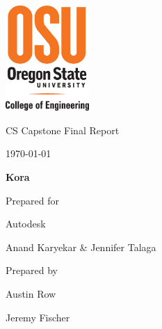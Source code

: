 \documentclass[onecolumn, draftclsnofoot,10pt, compsoc]{IEEEtran}
\def \CapstoneTeamName{\textbf{Insert Team Name Here} }
\def \botname{Kora\xspace}
\def \GroupMemberOne{Austin Row}
\def \GroupMemberTwo{Jeremy Fischer}
\def \CapstoneProjectName{\botname}
\def \CapstoneSponsorCompany{Autodesk}
\def \CapstoneSponsorPerson{Anand Karyekar \& Jennifer Talaga}
\def \DocType{ Final Report}
\newcommand{\NameSigPair}[1]{\par
\makebox[2.75in][r]{#1} \hfil 	\makebox[3.25in]{\makebox[2.25in]{\hrulefill} \hfill		\makebox[.75in]{\hrulefill}}
\par\vspace{-12pt} \textit{\tiny\noindent
\makebox[2.75in]{} \hfil		\makebox[3.25in]{\makebox[2.25in][r]{Signature} \hfill	\makebox[.75in][r]{Date}}}}
\renewcommand{\NameSigPair}[1]{#1}
\begin{document}
\begin{titlepage}
    \begin{singlespace}
    	\includegraphics[height=4cm]{coe_v_spot1}
        \par\vspace{.2in}
        \centering
        \scshape{
            \huge CS Capstone \DocType \par
            {\large\today}\par
            \vspace{.5in}
            \textbf{\Huge\CapstoneProjectName}\par
            \vfill
            {\large Prepared for}\par
            \Huge \CapstoneSponsorCompany\par
            \vspace{5pt}
            {\Large\NameSigPair{\CapstoneSponsorPerson}\par}
            {\large Prepared by }\par
            \vspace{5pt}
            {\Large
                \NameSigPair{\GroupMemberOne}\par
                \NameSigPair{\GroupMemberTwo}\par
            }
            \vspace{20pt}
        }
        \begin{abstract}

        \end{abstract}
    \end{singlespace}
\end{titlepage}
\newpage
{}
\tableofcontents
\clearpage
\end{document}
